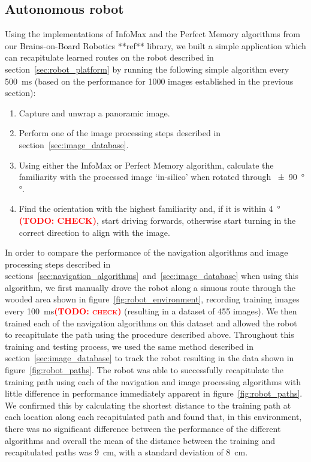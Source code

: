 \documentclass[letterpaper]{article}
\newcommand{\todo}[1]{\textbf{\textsc{\textcolor{red}{(TODO: #1)}}}}
\begin{document}
\subsection{Autonomous robot}
Using the implementations of InfoMax and the Perfect Memory algorithms from our Brains-on-Board Robotics **ref** library, we built a simple application which can recapitulate learned routes on the robot described in section~\ref{sec:robot_platform} by running the following simple algorithm every \SI{500}{\milli\second} (based on the performance for 1000 images established in the previous section):
\begin{enumerate}
    \item Capture and unwrap a panoramic image.
    \item Perform one of the image processing steps described in section~\ref{sec:image_database}.
    \item Using either the InfoMax or Perfect Memory algorithm, calculate the familiarity with the processed image ‘in-silico’ when rotated through \SI{\pm 90}{\degree}°.
    \item Find the orientation with the highest familiarity and, if it is within \SI{4}{\degree} \todo{CHECK}, start driving forwards, otherwise start turning in the correct direction to align with the image.
\end{enumerate}
In order to compare the performance of the navigation algorithms and image processing steps described in sections~\ref{sec:navigation_algorithms}~and~\ref{sec:image_database} when using this algorithm, we first manually drove the robot along a sinuous route through the wooded area shown in figure~\ref{fig:robot_environment}, recording training images every \SI{100}{\milli\second}\todo{check} (resulting in a dataset of \num{455} images).
We then trained each of the navigation algorithms on this dataset and allowed the robot to recapitulate the path using the procedure described above.
Throughout this training and testing process, we used the same method described in section~\ref{sec:image_database} to track the robot resulting in the data shown in figure~\ref{fig:robot_paths}.
The robot was able to successfully recapitulate the training path using each of the navigation and image processing algorithms with little difference in performance immediately apparent in figure~\ref{fig:robot_paths}.
We confirmed this by calculating the shortest distance to the training path at each location along each recapitulated path and found that, in this environment, there was no significant difference between the performance of the different algorithms and overall the mean of the distance between the training and recapitulated paths was \SI{9}{\centi\metre}, with a standard deviation of \SI{8}{\centi\metre}.
\end{document}
